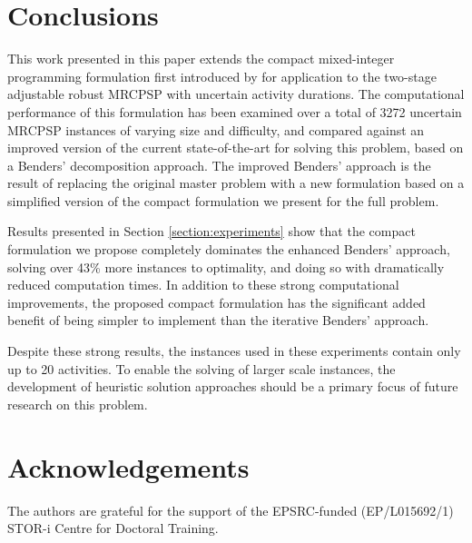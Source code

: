 \documentclass[a4paper,abstracton]{scrartcl}
\begin{document}
\section{Conclusions}

This work presented in this paper extends the compact mixed-integer programming formulation first introduced by \cite{bold2021compact} for application to the two-stage adjustable robust MRCPSP with uncertain activity durations. The computational performance of this formulation has been examined over a total of 3272 uncertain MRCPSP instances of varying size and difficulty, and compared against an improved version of the current state-of-the-art for solving this problem, based on a Benders' decomposition approach. The improved Benders' approach is the result of replacing the original master problem with a new formulation based on a simplified version of the compact formulation we present for the full problem. 

Results presented in Section \ref{section:experiments} show that the compact formulation we propose completely dominates the enhanced Benders' approach, solving over 43\% more instances to optimality, and doing so with dramatically reduced computation times. In addition to these strong computational improvements, the proposed compact formulation has the significant added benefit of being simpler to implement than the iterative Benders' approach.

Despite these strong results, the instances used in these experiments contain only up to 20 activities. To enable the solving of larger scale instances, the development of heuristic solution approaches should be a primary focus of future research on this problem. 

\section*{Acknowledgements}

The authors are grateful for the support of the EPSRC-funded (EP/L015692/1) STOR-i Centre for Doctoral Training.


\end{document}

